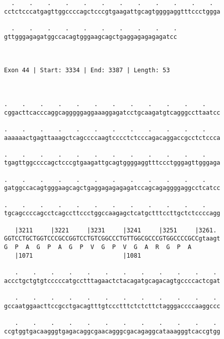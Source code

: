 \documentclass{article}
\begin{document}
\begin{Verbatim}
  .    .    .    .    .    .    .    .    .    .    .    .  
cctctcccatgagttggccccagctcccgtgaagattgcagtggggaggtttccctggga
                                                            
  .    .    .    .    .    .    .    .    .    .
gttgggagagatggccacagtgggaagcagctgaggagagagagatcc
                                                
                                                
 
Exon 44 | Start: 3334 | End: 3387 | Length: 53



.    .    .    .    .    .    .    .    .    .    .    .    
cggacttcacccaggcagggggaggaaaggagatcctgcaagatgtcagggccttaatcc
                                                            
.    .    .    .    .    .    .    .    .    .    .    .    
aaaaaactgagttaaagctcagccccaagtcccctctcccagacaggaccgcctctccca
                                                            
.    .    .    .    .    .    .    .    .    .    .    .    
tgagttggccccagctcccgtgaagattgcagtggggaggtttccctgggagttgggaga
                                                            
.    .    .    .    .    .    .    .    .    .    .    .    
gatggccacagtgggaagcagctgaggagagagagatccagcagaggggaggcctcatcc
                                                            
.    .    .    .    .    .    .    .    .    .    .    .    
tgcagccccagcctcagccttccctggccaagagctcatgctttccttgctctccccagg
                                                            
   |3211     |3221     |3231     |3241     |3251     |3261. 
GGTCCTGCTGGTCCCGCCGGTCCTGTCGGCCCTGTTGGCGCCCGTGGCCCCGCCgtaagt
G  P  A  G  P  A  G  P  V  G  P  V  G  A  R  G  P  A        
   |1071                         |1081                      
  
   .    .    .    .    .    .    .    .    .    .    .    . 
accctgctgtgtcccccatgcctttagaactctacagatgcagacagtgccccactcgat
                                                            
   .    .    .    .    .    .    .    .    .    .    .    . 
gccaatggaacttccgcctgacagtttgtccctttctctcttctagggaccccaaggccc
                                                            
   .    .    .    .    .    .    .    .    .    .    .    . 
ccgtggtgacaagggtgagacaggcgaacagggcgacagaggcataaagggtcaccgtgg
                                                            

\end{Verbatim}
\end{document}
